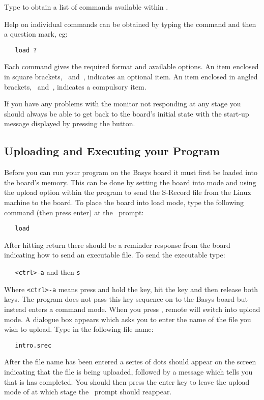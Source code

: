 Type  to obtain a list of commands available within \WRAMPmon.

Help on individual commands can be obtained by typing the command and then a 
question mark, eg:
\begin{verbatim}
   load ?
\end{verbatim}

Each command gives the required format and available options.
An item enclosed in square brackets, \src{[}~and~\src{]},
indicates an optional item. An item enclosed in angled brackets, 
\src{<}~and~\src{>}, indicates a compulsory item.

If you have any problems with the monitor not responding at any stage you 
should always be able to get back to the board's initial state with the
start-up message displayed by pressing the  button.

\subsection{Uploading and Executing your Program}
Before you can run your program on the Basys board it must first be loaded
into the board's memory. This can be done by setting the board into 
mode and using the upload option within the  program to send
the S-Record file from the Linux machine to the board. To place the board
into load mode, type the following command (then press enter) at the
\WRAMPmon\ prompt:
\begin{verbatim}
   load
\end{verbatim}

After hitting return there should be a reminder response from the board
indicating how to send an executable file. To send the executable type:

\verb|   <ctrl>-a| and then \verb|s|

Where \verb|<ctrl>-a| means press and hold the  key, hit 
the  key and then release both keys.
The  program does not pass this key sequence on to the Basys 
board but instead enters a command mode. When you press , remote will
switch into upload mode. A dialogue box appears which asks you to enter the name
of the file you wish to upload. Type in the following file name:
\begin{verbatim}
   intro.srec
\end{verbatim}

After the file name has been entered a series of dots should appear on the 
screen indicating that the file is being uploaded, followed by a message which
tells you that is has completed. You should then press the enter key to
leave the upload mode of  at which stage the \WRAMPmon\ prompt 
should reappear.

